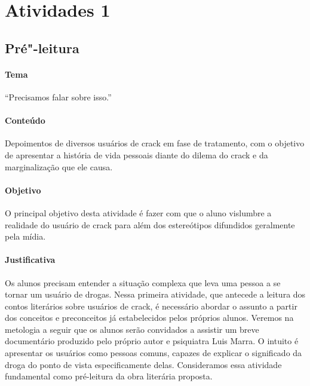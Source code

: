 \documentclass[12pt]{extarticle}
\begin{document}
\tableofcontents


\section{Atividades 1}


\subsection{Pré"-leitura}


\paragraph{Tema} ``Precisamos falar sobre isso.'' 

\paragraph{Conteúdo} Depoimentos de diversos usuários de crack em 
fase de tratamento, com o objetivo de apresentar a história de 
vida pessoais diante do dilema do crack e da marginalização que ele causa. 

\paragraph{Objetivo} O principal objetivo desta atividade 
é fazer com que o aluno vislumbre a realidade do usuário de 
crack para além dos estereótipos difundidos geralmente 
pela mídia. 

\paragraph{Justificativa} Os alunos precisam 
entender a situação complexa que leva uma pessoa a se tornar um usuário de drogas. 
Nessa primeira atividade, 
que antecede a leitura dos contos literários sobre usuários de crack, 
é necessário abordar o assunto a partir dos conceitos e
preconceitos já estabelecidos pelos próprios alunos. 
Veremos na metologia a seguir que os alunos serão 
convidados a assistir um breve documentário produzido pelo 
próprio autor e psiquiatra Luis Marra. O intuito é apresentar 
os usuários como pessoas comuns, capazes de explicar o significado da droga 
do ponto de vista especificamente delas. Consideramos essa 
atividade fundamental como pré-leitura da obra literária proposta.
\end{document}

